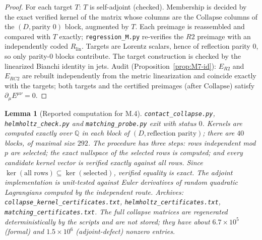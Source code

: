 \documentclass{article}
\newtheorem{lemma}[proposition]{Lemma}
\theoremstyle{remark}
\newcommand{\Coll}{\mathrm{Collapse}}
\begin{document}
\begin{proof}
For each target $T$: $T$ is self-adjoint (checked).
Membership is decided by the exact verified kernel of the matrix whose columns are the $\Coll$ columns of the $(D,\text{parity }0)$ block, augmented by $T$.
Each preimage is reassembled and compared with $T$ exactly; \texttt{regression\_M.py} re-verifies the $R2$ preimage with an independently coded $R_{\mathrm{lin}}$.
Targets are Lorentz scalars, hence of reflection parity $0$, so only parity-$0$ blocks contribute.
The target construction is checked by the linearized Bianchi identity in jets.
Audit (Proposition~\ref{prop:M7-id}): $E_{R2}$ and $E_{RC2}$ are rebuilt independently from the metric linearization and coincide exactly with the targets; both targets and the certified preimages (after $\Coll$) satisfy $\partial_\mu E^{\mu\nu}=0$.
\end{proof}

\begin{lemma}[Reported computation for M.4]
\label{lem:M4comp}
\texttt{contact\_collapse.py}, \texttt{helmholtz\_check.py} and \texttt{matching\_probe.py} exit with status $0$.
Kernels are computed exactly over $\mathbb Q$ in each block of $(D,\text{reflection parity})$; there are $40$ blocks, of maximal size $292$.
The procedure has three steps: rows independent mod $p$ are selected; the exact nullspace of the selected rows is computed; and every candidate kernel vector is verified exactly against \emph{all} rows.
Since $\ker(\text{all rows})\subseteq\ker(\text{selected})$, verified equality is exact.
The adjoint implementation is unit-tested against Euler derivatives of random quadratic Lagrangians computed by the independent route.
Archives: \texttt{collapse\_kernel\_certificates.txt}, \texttt{helmholtz\_certificates.txt}, \texttt{matching\_certificates.txt}.
The full collapse matrices are regenerated deterministically by the scripts and are not stored; they have about $6.7\times10^5$ (formal) and $1.5\times10^6$ (adjoint-defect) nonzero entries.
\end{lemma}
\end{document}
